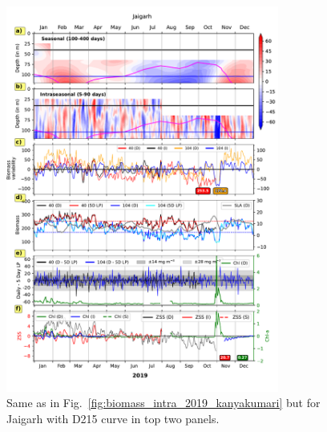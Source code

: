 \documentclass[12pt,a4paper]{article}
\begin{document}
\begin{figure}[htbp]
	\centering
	\includegraphics[width=0.8\textwidth]{./figures/biomass_intra_2019_jaigarh.pdf} 
	\caption{Same as in Fig.~\ref{fig:biomass_intra_2019_kanyakumari} but for Jaigarh with D215 curve in top two panels.}		
	\label{fig:biomass_intra_2019_jaigarh}
\end{figure}
\end{document}
